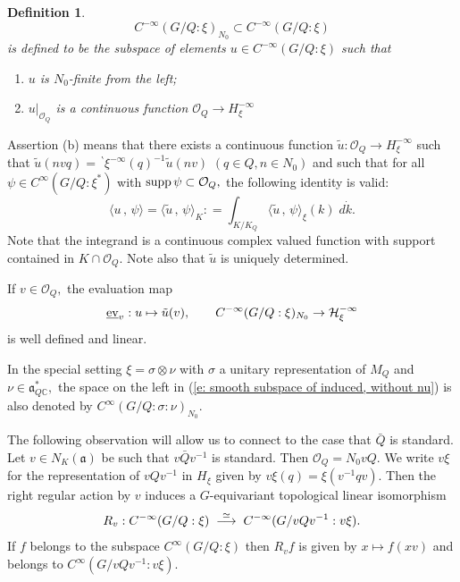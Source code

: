 \documentclass[12pt,a4paper]{article}
\newtheorem{Defi}[Thm]{Definition}
\newenvironment{defi}[0]{\begin{Defi}\noindent\rm}%
{\end{Defi}}
\def\qquad{\quad\quad}
\def\itema{\vspace{-1mm}\item[{\rm (a)}]}
\def\itemb{\item[{\rm (b)}]}
\def\msy#1{{\mathbb #1}}
\def\C{{\msy C}}
\def\gs{\sigma}
\def\got#1{\mathfrak #1}
\def\fa{{\got a}}
\def\to{\rightarrow}
\def\inp#1#2{\langle#1\,,\,#2\rangle}
\def\iC{{\scriptscriptstyle \C}}
\def\cH{{\mathcal H}}
\def\cO{{\mathcal O}}
\numberwithin{Thm}{section}
\numberwithin{equation}{section}
\def\supp{{\rm supp}}
\def\ev{{\rm ev}}
\numberwithin{equation}{section}
\def\bp{\!{\,}^\backprime}
\def\faQdc{\fa_{Q\iC}^*}
\begin{document}
\begin{defi}
\label{d: defi sub N zero}
\begin{equation}
\label{e: smooth subspace of induced, without nu}
C^{-\infty}(G/Q:\xi)_{N_0} \subset C^{-\infty}(G/Q:\xi)
\end{equation}
is defined to be the subspace of elements $u \in C^{-\infty}(G/Q:\xi)$ such that 
\begin{enumerate}
\itema $u$ is $N_0$-finite from the left;
\itemb $u|_{\cO_Q}$ is a continuous function
$\cO_Q \to H_\xi^{-\infty}$
\end{enumerate}
\end{defi}

%
Assertion (b) means that there exists a continuous function 
$\tilde u: \cO_Q \to H_\xi^{-\infty}$ such that $\tilde u(nvq) = \bp\xi^{-\infty}(q)^{-1}  \tilde u(nv)$ 
$(q\in Q, n \in N_0)$ and such that for all $\psi \in C^\infty(G/Q: \xi^*)$ 
with $\supp\, \psi \subset \cO_Q,$ 
the following identity is valid:
\begin{equation}
\label{e: partial K pairing}
\inp{u}{\psi} = \inp{\tilde u}{\psi}_K : = \int_{K/K_Q} \inp{\tilde u}{\psi}_\xi(k)  \; d\dot{k}.
\end{equation} 
Note that the integrand is a continuous complex valued function with support
contained in $K \cap \cO_Q.$ Note also that $\tilde u$ is uniquely determined.

If $v \in \cO_Q,$  the evaluation map 
$$ 
\underline\ev_v: u \mapsto \tilde u(v), \qquad C^{-\infty}(G/Q:\xi)_{N_0} \to \cH_\xi^{-\infty}
$$
is well defined and linear. 

In the special setting $\xi = \gs \otimes \nu $ with $\gs$ a unitary representation 
of $M_Q$ and $\nu \in \faQdc,$ the space on the left in (\ref{e: smooth subspace of induced, without nu})
is also denoted by $C^\infty(G/Q: \gs:\nu)_{N_0}.$ 

The following observation will allow us to connect to the case that $\bar Q$ is standard.
Let $v \in N_K(\fa)$ be such that $v \bar Q v^{-1}$ is standard. Then $\cO_Q= N_0 v Q.$ 
We write $v \xi$ for the representation of $vQv^{-1}$ in $H_\xi$ given by $v\xi(q) = \xi(v^{-1} q v).$ 
Then the right regular action by $v$  
induces  a $G$-equivariant topological linear isomorphism 
\begin{equation}
\label{e: Rv on gen vectors, xi} 
R_v: C^{-\infty}(G/Q: \xi) \;\;{\buildrel \simeq \over \longrightarrow}\; \; C^{-\infty}(G/vQv^{-1}: v\xi).
\end{equation} 
If $f$ belongs to the subspace $C^{\infty}(G/Q: \xi)$ then $R_v f$ is given by $x \mapsto f(xv)$ and belongs to $ C^{\infty}(G/vQv^{-1}: v\xi)$.
\end{document}
